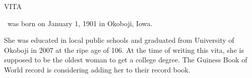 \begin{center}
\vspace*{0.01in}
VITA
\end{center}

\MyName\ was born on January 1, 1901 in Okoboji, Iowa. 


She was educated in local public schools
 and graduated from 
University of Okoboji in 2007 at the ripe age of 106. 
At the time of writing this vita, she is supposed to be the oldest woman to get a college degree. 
The Guiness Book of World record is considering adding her to their record book.
 



